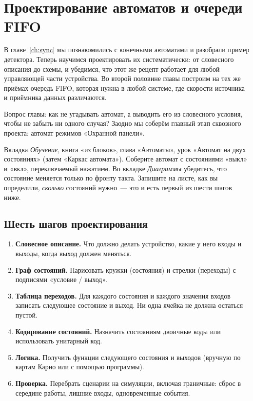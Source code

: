 \chapter{Проектирование автоматов и очереди FIFO}
\label{ch:fsmdesign}

В главе~\ref{ch:sync} мы познакомились с конечными автоматами и разобрали
пример детектора. Теперь научимся проектировать их систематически: от
словесного описания до схемы, и убедимся, что этот же рецепт работает для
любой управляющей части устройства. Во второй половине главы построим на тех
же приёмах очередь FIFO, которая нужна в любой системе, где скорости источника
и приёмника данных различаются.

Вопрос главы: как не угадывать автомат, а выводить его из словесного условия,
чтобы не забыть ни одного случая? Заодно мы соберём главный этап сквозного
проекта: автомат режимов «Охранной панели».

\begin{buildbox}
Вкладка \emph{Обучение}, книга «из блоков», глава «Автоматы», урок «Автомат на
двух состояниях» (затем «Каркас автомата»). Соберите автомат с состояниями
«выкл» и «вкл», переключаемый нажатием. Во вкладке \emph{Диаграммы} убедитесь,
что состояние меняется только по фронту такта. Запишите на листе, как вы
определили, \emph{сколько} состояний нужно~--- это и есть первый из шести шагов
ниже.
\end{buildbox}

\section{Шесть шагов проектирования}

\begin{enumerate}
  \item \textbf{Словесное описание.} Что должно делать устройство, какие у него
        входы и выходы, когда выход должен меняться.
  \item \textbf{Граф состояний.} Нарисовать кружки (состояния) и стрелки
        (переходы) с подписями «условие / выход».
  \item \textbf{Таблица переходов.} Для каждого состояния и каждого значения
        входов записать следующее состояние и выход. Ни одна ячейка не должна
        остаться пустой.
  \item \textbf{Кодирование состояний.} Назначить состояниям двоичные коды
        или использовать унитарный код.
  \item \textbf{Логика.} Получить функции следующего состояния и выходов
        (вручную по картам Карно или с помощью программы).
  \item \textbf{Проверка.} Перебрать сценарии на симуляции, включая
        граничные: сброс в середине работы, лишние входы, одновременные события.
\end{enumerate}

